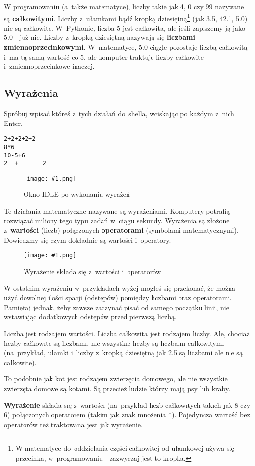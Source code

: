 \documentclass{book}
\newcommand{\img}[3]{
\begin{figure}
\centerline{
	\texttt{[image: \#1.png]}
}
\caption{#2}
\label{#1}
\end{figure}
}
\begin{document}
W programowaniu (a~także matematyce), liczby takie jak 4, 0 czy 99 nazywane są {\bf całkowitymi}. Liczby z~ułamkami bądź kropką dziesiętną\footnote{W matematyce do~oddzielania części całkowitej od ułamkowej używa się przecinka, w~programowaniu - zazwyczaj jest to kropka.} (jak 3.5, 42.1, 5.0) nie są całkowite. W~Pythonie, liczba 5 jest całkowita, ale jeśli zapiszemy ją jako 5.0 - już nie. Liczby z~kropką dziesiętną nazywają się {\bf liczbami zmiennoprzecinkowymi}. W~matematyce, 5.0 ciągle pozostaje liczbą całkowitą i~ma tą samą wartość co 5, ale komputer traktuje liczby całkowite i~zmiennoprzecinkowe inaczej.

\subsection{Wyrażenia}

Spróbuj wpisać któreś z~tych działań do~shella, wciskając po każdym z~nich Enter.

\begin{lstlisting}
2+2+2+2+2
8*6
10-5+6
2  +       2      
\end{lstlisting}

\img{idle-wyrazenia}{Okno IDLE po wykonaniu wyrażeń}{7 cm}

Te działania matematyczne nazywane są wyrażeniami. Komputery potrafią rozwiązać miliony tego typu zadań w~ciągu sekundy. Wyrażenia są złożone z~{\bf wartości} (liczb) połączonych {\bf operatorami} (symbolami matematycznymi). Dowiedzmy się czym dokładnie są wartości i~operatory.

\img{idle-wyroperwart}{Wyrażenie składa się z~wartości i~operatorów}{3 cm}

W ostatnim wyrażeniu w~przykładach wyżej mogłeś się przekonać, że można użyć dowolnej ilości spacji (odstępów) pomiędzy liczbami oraz operatorami. Pamiętaj jednak, żeby zawsze zaczynać pisać od samego początku linii, nie wstawiając dodatkowych odstępów przed pierwszą liczbą.

Liczba jest rodzajem wartości. Liczba całkowita jest rodzajem liczby. Ale, chociaż liczby całkowite są liczbami, nie wszystkie liczby są liczbami całkowitymi (na~przykład, ułamki i~liczby z~kropką dziesiętną jak 2.5 są liczbami ale nie są całkowite).

To podobnie jak kot jest rodzajem zwierzęcia domowego, ale nie wszystkie zwierzęta domowe są kotami. Są przecież ludzie którzy mają psy lub kraby. 

{\bf Wyrażenie} składa się z~wartości (na~przykład liczb całkowitych takich jak 8 czy 6) połączonych operatorem (takim jak znak mnożenia *). Pojedyncza wartość bez operatorów też traktowana jest jak wyrażenie.
\end{document}

